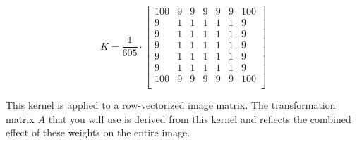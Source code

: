\documentclass[unicode,11pt,a4paper,oneside,numbers=endperiod,openany]{scrartcl}
\begin{document}
\[
K = \frac{1}{605} \cdot
\begin{bmatrix}
 100 & 9 & 9 & 9 & 9 & 9 & 100 \\
 9 & 1 & 1 & 1 & 1 & 1 & 9 \\
 9 & 1 & 1 & 1 & 1 & 1 & 9 \\
 9 & 1 & 1 & 1 & 1 & 1 & 9 \\
 9 & 1 & 1 & 1 & 1 & 1 & 9 \\
 9 & 1 & 1 & 1 & 1 & 1 & 9 \\
 100 & 9 & 9 & 9 & 9 & 9 & 100 \\
\end{bmatrix}
\]

This kernel is applied to a row-vectorized image matrix. The transformation matrix \( A \) that you will use is derived from this kernel and reflects the combined effect of these weights on the entire image.
\end{document}
